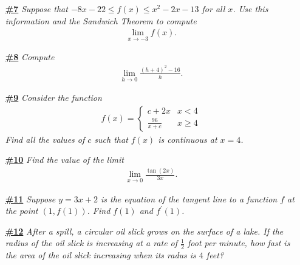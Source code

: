 \documentclass[a4paper,12pt]{article} %
\theoremstyle{plain}
\theoremstyle{definition}
\newcommand{\p}{^\prime}
\begin{document}
\begin{enumerate}
\newpage
\item[\underline{\textbf{\#7}}] \textit{Suppose that $-8x -22\le f(x) \le x^2 -2x -13$ for all $x$. Use this information and the Sandwich Theorem to compute 
  \begin{align*}
    \lim_{x\to -3} f(x).
  \end{align*}}
\newpage
\item[\underline{\textbf{\#8}}] \textit{Compute
  \begin{align*}
    \lim_{h\to 0} \frac{(h+4)^2 -16}{h}.
  \end{align*}}
\newpage
\item[\underline{\textbf{\#9}}] \textit{ Consider the function
  \begin{align*}
    f(x) = \begin{cases}
        c + 2x & x < 4 \\
        \frac{96}{x + c} & x \ge 4
    \end{cases}
  \end{align*}
Find all the values of $c$ such that $f(x)$ is continuous at $x = 4$.}
\newpage
\item[\underline{\textbf{\#10}}] \textit{Find the value of the limit 
  \begin{align*}
  \lim_{x \to 0} \frac{\tan(2x)}{3x}.
  \end{align*}}
\newpage
\item[\underline{\textbf{\#11}}] \textit{Suppose $y = 3x +2$ is the equation of the tangent line to a function $f$ at the point $(1,f(1))$. Find $f(1)$ and $f\p(1)$.}
\newpage

\item[\underline{\textbf{\#12}}] \textit{After a spill, a circular oil slick grows on the surface of a lake.  If the radius of the oil slick is increasing at a rate of $\frac{1}{2}$ foot per minute, how fast is the area of the oil slick increasing when its radus is $4$ feet?}
\newpage
\end{enumerate}
\end{document}

